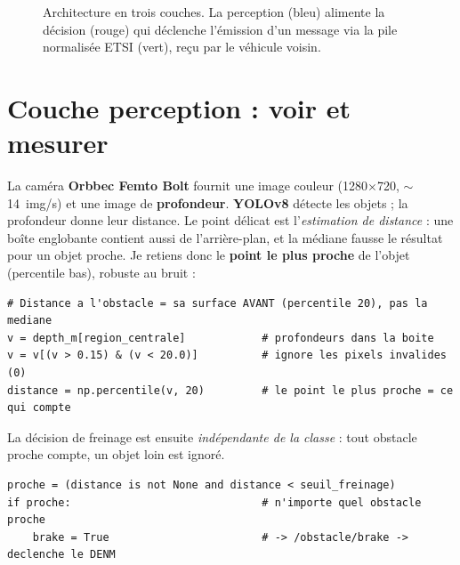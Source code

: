 \documentclass[a4paper,11pt]{article}
\begin{document}
\begin{figure}[h]
{}
\caption{Architecture en trois couches. La perception (bleu) alimente la décision (rouge) qui
déclenche l'émission d'un message via la pile normalisée ETSI (vert), reçu par le véhicule voisin.}
\label{fig:archi}
\end{figure}

\section{Couche perception : voir et mesurer}
La caméra \textbf{Orbbec Femto Bolt} fournit une image couleur (1280$\times$720, $\sim$14~img/s)
et une image de \textbf{profondeur}. \textbf{YOLOv8} détecte les objets ; la profondeur donne
leur distance. Le point délicat est l'\emph{estimation de distance} : une boîte englobante
contient aussi de l'arrière-plan, et la médiane fausse le résultat pour un objet proche. Je
retiens donc le \textbf{point le plus proche} de l'objet (percentile bas), robuste au bruit :

\begin{lstlisting}[style=py]
# Distance a l'obstacle = sa surface AVANT (percentile 20), pas la mediane
v = depth_m[region_centrale]            # profondeurs dans la boite
v = v[(v > 0.15) & (v < 20.0)]          # ignore les pixels invalides (0)
distance = np.percentile(v, 20)         # le point le plus proche = ce qui compte
\end{lstlisting}

La décision de freinage est ensuite \emph{indépendante de la classe} : tout obstacle proche
compte, un objet loin est ignoré.

\begin{lstlisting}[style=py]
proche = (distance is not None and distance < seuil_freinage)
if proche:                              # n'importe quel obstacle proche
    brake = True                        # -> /obstacle/brake -> declenche le DENM
\end{lstlisting}
\end{document}
